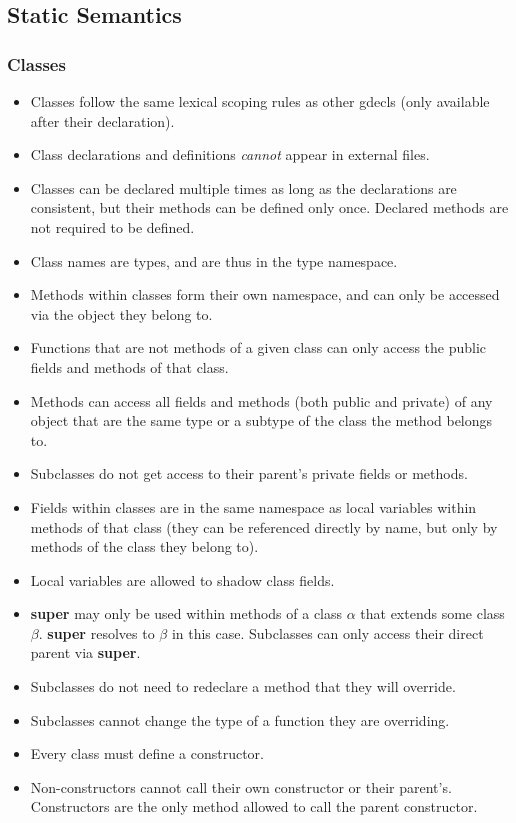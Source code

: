 \documentclass{article}
\newcommand{\term}[1]{\textbf {#1}}
\begin{document}
\newpage
\subsection{Static Semantics}
\subsubsection{Classes}
\begin{itemize}
\item Classes follow the same lexical scoping rules as other gdecls (only
      available after their declaration).
\item Class declarations and definitions \emph{cannot} appear in external files.
\item Classes can be declared multiple times as long as the declarations are
      consistent, but their methods can be defined only once. Declared methods
      are not required to be defined.
\item Class names are types, and are thus in the type namespace.
\item Methods within classes form their own namespace, and can only be accessed
      via the object they belong to.
\item Functions that are not methods of a given class can only access the public
      fields and methods of that class.
\item Methods can access all fields and methods (both public and private) of any
      object that are the same type or a subtype of the class the method belongs to.
\item Subclasses do not get access to their parent's private fields or methods.
\item Fields within classes are in the same namespace as local variables within
      methods of that class (they can be referenced directly by name, but only
      by methods of the class they belong to).
\item Local variables are allowed to shadow class fields.
\item \term{super} may only be used within methods of a class $\alpha$ that
      extends some class $\beta$. \term{super} resolves to $\beta$ in this
      case. Subclasses can only access their direct parent via \term{super}.
\item Subclasses do not need to redeclare a method that they will override.
\item Subclasses cannot change the type of a function they are overriding.
\item Every class must define a constructor.
\item Non-constructors cannot call their own constructor or their parent's.
      Constructors are the only method allowed to call the parent constructor.
\end{itemize}
\end{document}
